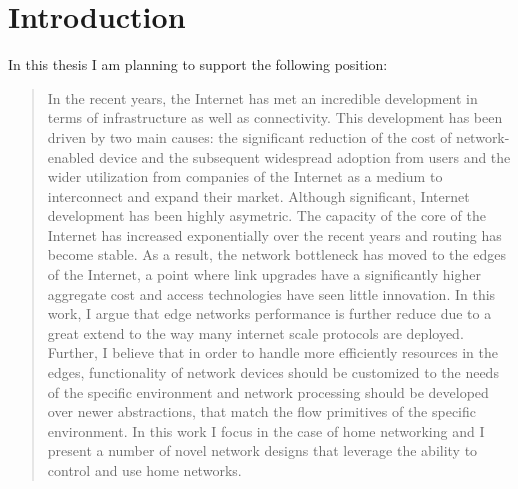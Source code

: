 \chapter{Introduction}
\ifpdf
    \graphicspath{{Introduction/IntroductionFigs/PNG/}{Introduction/IntroductionFigs/PDF/}{Introduction/IntroductionFigs/}}
\else
    \graphicspath{{Introduction/IntroductionFigs/EPS/}{Introduction/IntroductionFigs/}}
\fi

In this thesis I am planning to support the following position:

\begin{quotation}
In the recent years, the Internet has met an incredible development in terms of
infrastructure as well as connectivity. This development has been driven by two
main causes: the significant reduction of the cost of network-enabled device and
the subsequent widespread adoption from users and
the wider utilization from companies of the Internet as a medium to interconnect and
expand their market. Although significant, Internet development has been highly
asymetric. The capacity of the core of the Internet has increased
exponentially over the recent years and routing has become stable. 
As a result, the network bottleneck has moved to the edges of the Internet, a
point where link upgrades have a significantly higher aggregate cost and access 
technologies have seen little innovation.
In this work, I argue that edge networks performance is further reduce due to
a great extend to the way many internet scale protocols are deployed.
Further, I believe that in order to handle more efficiently
resources in the edges, functionality of network devices should be customized to
the needs of the specific environment and network processing should be developed
over newer abstractions, that match the flow primitives of the specific
environment. In this work I focus in the case of home networking and I present
a number of novel network designs that leverage the ability to control and use
home networks.
\end{quotation}

